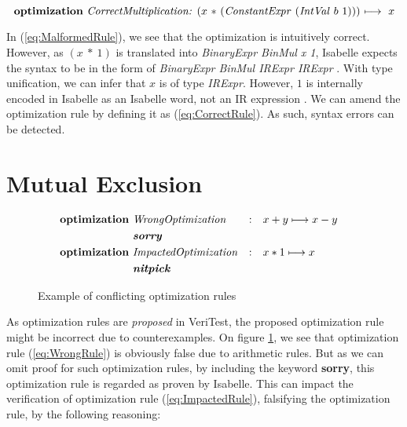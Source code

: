 \begin{equation}
    \text{\textbf{optimization} \emph{CorrectMultiplication:} \((x\ *\) (\emph{ConstantExpr} (\emph{IntVal} \(b\ 1\)))) \(\longmapsto\ x\)}
    \label{eq:CorrectRule}
\end{equation}

In (\ref{eq:MalformedRule}), we see that the optimization is intuitively correct. However, as \((x\ *\ 1)\) is translated into 
\emph{BinaryExpr BinMul x 1}, Isabelle expects the syntax to be in the form of \emph{BinaryExpr BinMul IRExpr IRExpr} 
\cite[Definition 1]{Term_Graph_Optimizations}. With type unification, we can infer that \(x\) is of type \emph{IRExpr}. However, \(1\) is 
internally encoded in Isabelle as an Isabelle word, not an IR expression \cite[Definition 2]{Term_Graph_Optimizations}. We can amend the 
optimization rule by defining it as (\ref{eq:CorrectRule}). As such, syntax errors can be detected.

\section{Mutual Exclusion}
\label{sec:MutualExclusion}

\begin{figure}[!htb]
    \begin{alignat}{3}
        \text{\textbf{optimization} } & \text{\emph{WrongOptimization}} & : \quad & \text{\emph{\(x + y \longmapsto x - y\)}} & \label{eq:WrongRule} \\
        & \text{\textbf{\emph{sorry}}} & & & \nonumber \\
        \text{\textbf{optimization} } & \text{\emph{ImpactedOptimization}} & : \quad & \text{\emph{\(x * 1 \longmapsto x\)}} & \label{eq:ImpactedRule} \\
        & \text{\textbf{\emph{nitpick}}} & & & \nonumber
    \end{alignat}

    \caption{Example of conflicting optimization rules}
    \label{fig:conflictingRules}
\end{figure}

As optimization rules are \emph{proposed} in VeriTest, the proposed optimization rule might be incorrect due to counterexamples. On figure 
\ref{fig:conflictingRules}, we see that optimization rule (\ref{eq:WrongRule}) is obviously false due to arithmetic rules. But as we can omit 
proof for such optimization rules, by including the keyword \textbf{sorry}, this optimization rule is regarded as proven by Isabelle. This can 
impact the verification of optimization rule (\ref{eq:ImpactedRule}), falsifying the optimization rule, by the following reasoning:

